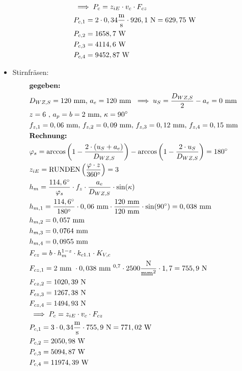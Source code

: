 \begin{itemize}
\begin{align*}
	&\implies P_c = z_{iE} \cdot v_c \cdot F_{cz} \\
	&P_{c,1} = 2 \cdot 0,34 \frac{\text{m}}{\text{s}} \cdot 926,1 \text{ N} = 629,75 \text{ W} \\
	&P_{c,2} = 1658,7 \text{ W} \\
	&P_{c,3} = 4114,6 \text{ W} \\
	&P_{c,4} = 9452,87 \text{ W} \\
\end{align*}
\item{Stirnfräsen:}
\begin{align*}
	&\textbf{gegeben: } \\
	&D_{WZ,S} = 120 \text{ mm, } a_e = 120 \text{ mm } \implies u_{S} = \frac{D_{WZ,S}}{2} - a_e = 0 \text{ mm} \\
	&z= 6 \text{ , } a_p=b=2\text{ mm, } \kappa = 90^\circ\\
	&f_{z,1} = 0,06 \text{ mm, } f_{z,2} = 0,09 \text{ mm, } f_{z,3} = 0,12 \text{ mm, } f_{z,4} = 0,15 \text{ mm } \\
	&\textbf{Rechnung: } \\
	&\varphi_s = \arccos \left( 1-  \frac{2\cdot (u_{S} + a_e)}{D_{WZ,S}} \right) - \arccos \left( 1-  \frac{2\cdot u_{S}}{D_{WZ,S}} \right) =180 ^\circ \\
	&z_{iE} = \text{RUNDEN}\left( \frac{\varphi \cdot z}{360 ^\circ} \right) = 3 \\
	&h_m = \frac{114,6 ^\circ}{\varphi_s} \cdot f_z \cdot \frac{a_e}{D_{WZ,S}} \cdot \sin (\kappa ) \\
	&h_{m,1} = \frac{114,6 ^\circ}{180 ^\circ} \cdot 0,06 \text{ mm} \cdot \frac{120\text{ mm}}{120 \text{ mm}} \cdot \sin (90 ^\circ )  =  0,038 \text{ mm} \\
	&h_{m,2} = 0,057 \text{ mm} \\
	&h_{m,3} = 0,0764 \text{ mm} \\
	&h_{m,4} = 0,0955 \text{ mm} \\
	&F_{cz} = b \cdot h_m ^{1-z} \cdot k_{c1.1} \cdot K_{V,c}\\
	&F_{cz,1} = 2 \text{ mm } \cdot 0,038 \text{ mm } ^{0,7}  \cdot 2500 \frac{\text{N}}{\text{mm} ^2} \cdot 1,7= 755,9 \text{ N} \\
	&F_{cz,2} = 1020,39 \text{ N} \\
	&F_{cz,3} = 1267,38 \text{ N} \\
	&F_{cz,4} = 1494,93 \text{ N} \\
	&\implies P_c = z_{iE} \cdot v_c \cdot F_{cz} \\
	&P_{c,1} = 3 \cdot 0,34 \frac{\text{m}}{\text{s}} \cdot 755,9 \text{ N} = 771,02 \text{ W} \\
	&P_{c,2} = 2050,98 \text{ W} \\
	&P_{c,3} = 5094,87 \text{ W} \\
	&P_{c,4} = 11974,39 \text{ W} \\
\end{align*}
\end{itemize}
